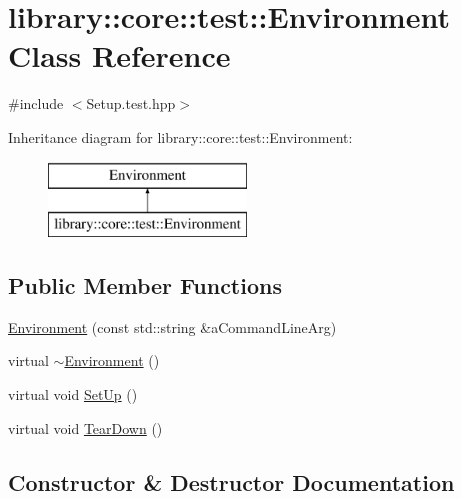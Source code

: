 \hypertarget{classlibrary_1_1core_1_1test_1_1Environment}{}\section{library\+:\+:core\+:\+:test\+:\+:Environment Class Reference}
\label{classlibrary_1_1core_1_1test_1_1Environment}


{\ttfamily \#include $<$Setup.\+test.\+hpp$>$}

Inheritance diagram for library\+:\+:core\+:\+:test\+:\+:Environment\+:\begin{figure}[H]
\begin{center}
\leavevmode
\includegraphics[height=2.000000cm]{classlibrary_1_1core_1_1test_1_1Environment}
\end{center}
\end{figure}
\subsection*{Public Member Functions}
\begin{DoxyCompactItemize}
\item 
\hyperlink{classlibrary_1_1core_1_1test_1_1Environment_a9d19ce75acc2f925fdb9b4aedb878f36}{Environment} (const std\+::string \&a\+Command\+Line\+Arg)
\item 
virtual \hyperlink{classlibrary_1_1core_1_1test_1_1Environment_a2058a6eb2742e54834e3e3668ded9730}{$\sim$\+Environment} ()
\item 
virtual void \hyperlink{classlibrary_1_1core_1_1test_1_1Environment_a7df7865fafe2063af5cdefbad07654f7}{Set\+Up} ()
\item 
virtual void \hyperlink{classlibrary_1_1core_1_1test_1_1Environment_a3444effa83590e22490aac79d311853b}{Tear\+Down} ()
\end{DoxyCompactItemize}


\subsection{Constructor \& Destructor Documentation}
\mbox{\label{classlibrary_1_1core_1_1test_1_1Environment_a9d19ce75acc2f925fdb9b4aedb878f36}} 
